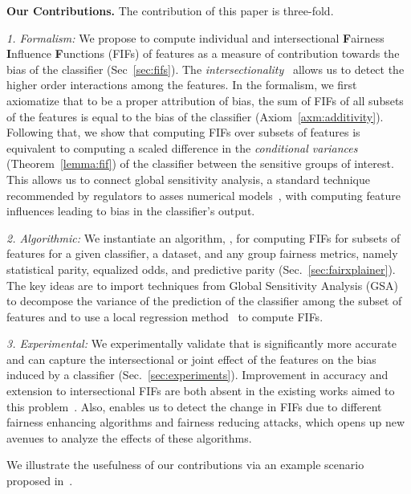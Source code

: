 \noindent\textbf{Our Contributions.} The contribution of this paper is three-fold.

\textit{1. Formalism:} We propose to compute individual and intersectional \textbf{F}airness \textbf{I}nfluence \textbf{F}unctions (FIFs) of features as a measure of contribution towards the bias of the classifier (Sec~\ref{sec:fifs}). The \textit{intersectionality}~\cite{buolamwini2018gender} allows us to detect the higher order interactions among the features. In the formalism, we first axiomatize that to be a proper attribution of bias, the sum of FIFs of all subsets of the features is equal to the bias of the classifier (Axiom~\ref{axm:additivity}). Following that, we show that computing FIFs over subsets of features is equivalent to computing a scaled difference in the \emph{conditional variances} (Theorem~\ref{lemma:fif}) of the classifier between the sensitive groups of interest. This allows us to connect global sensitivity analysis, a standard technique recommended by regulators to asses numerical models~\cite{eu,usepa}, with computing feature influences leading to bias in the classifier's output.%

\textit{2. Algorithmic:} We instantiate an algorithm, {\fairXplainer}, for computing FIFs for subsets of features for a given classifier, a dataset, and any group fairness metrics, namely statistical parity, equalized odds, and predictive parity (Sec.~\ref{sec:fairxplainer}).  The key ideas are to import techniques from Global Sensitivity Analysis (GSA)~\cite{saltelli2008global} to decompose the variance of the prediction of the classifier among the subset of features and to use a local regression method~\cite{loader2006local} to compute FIFs. 

\textit{3. Experimental:} We experimentally validate that {\fairXplainer} is significantly more accurate and can capture the intersectional or joint effect of the features on the bias induced by a classifier (Sec.~\ref{sec:experiments}). Improvement in accuracy and extension to intersectional FIFs are both absent in the existing works aimed to this problem~\cite{begley2020explainability,lundberg2020explaining}. Also, {\fairXplainer} enables us to detect the change in FIFs due to different fairness enhancing algorithms and fairness reducing attacks, which opens up new avenues to analyze the effects of these algorithms. 

We illustrate the usefulness of our contributions via an example scenario proposed in~\cite{ghosh2020justicia}. 


